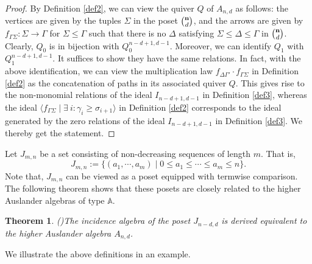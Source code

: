 \documentclass{amsart}
\newcommand{\A}{\mathbb{A}}
\theoremstyle{plain}
\newtheorem{Thm}{Theorem}[section]
\theoremstyle{definition}
\numberwithin{equation}{section}
\begin{document}
\begin{proof}
By Definition \ref{def2}, we can view the quiver $Q$ of $A_{n,d}$ as follows: the vertices are given by the tuples $\Sigma$ in the poset $\binom{\bf n}{d}$, and the arrows are given by $f_{\Gamma\Sigma}:\Sigma\to\Gamma$ for $\Sigma\le\Gamma$ such that there is no $\Delta$ satisfying $\Sigma\le\Delta\le\Gamma$ in $\binom{\bf n}{d}$. Clearly, $Q_0$ is in bijection with $Q_0^{n-d+1,d-1}$. Moreover, we can identify $Q_1$ with $Q_1^{n-d+1,d-1}$. It suffices to show they have the same relations. In fact, with the above identification, we can view the multiplication law $f_{\Delta\Gamma'}\cdot f_{\Gamma\Sigma}$ in Definition \ref{def2} as the concatenation of paths in its associated quiver $Q$. This  gives rise to the non-monomial relations of the ideal $I_{n-d+1,d-1}$ in Definition \ref{def3}, whereas the  ideal \sloppy $\langle f_{\Gamma\Sigma}\mid \exists\ i:\gamma_i\ge \sigma_{i+1} \rangle$  in Definition \ref{def2} corresponds to the ideal generated by the zero relations  of the ideal $I_{n-d+1,d-1}$ in Definition \ref{def3}. We thereby get the statement. 
\end{proof}





Let $J_{m,n}$ be a set consisting of non-decreasing sequences of length $m$. That is, \[J_{m,n}:=\{(a_1,\cdots,a_m)\mid 0\le a_1\le \cdots\le a_m\le n \}. \] Note that, $J_{m,n}$ can be viewed as a poset equipped with termwise comparison. The following theorem shows that these posets are closely related to the higher Auslander algebras of type $\A$.

\begin{Thm}{\rm (\cite[Theorem E]{Gottesman26})}\label{thm:der-equ}
    The incidence algebra of the poset $J_{n-d,d}$ is derived equivalent to the higher Auslander algebra $A_{n,d}$.
\end{Thm}

We illustrate the above definitions in an example. 
\end{document}
